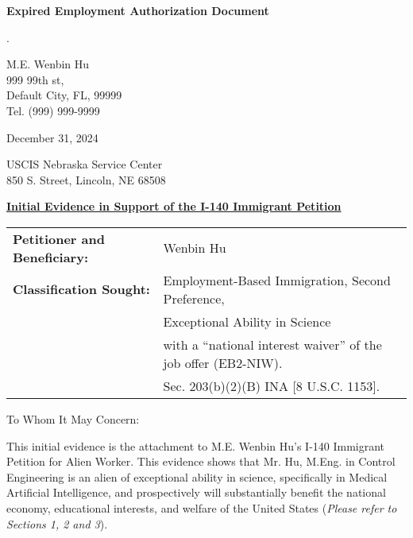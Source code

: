 \documentclass{article}
\begin{document}
% 

\vspace*{\fill}
\begin{center}

{\LARGE \bf
Expired Employment Authorization Document
}

\end{center}
\vspace*{\fill}

.

% 



\begin{flushright}
M.E. Wenbin Hu\\
999 99th st,\\
Default City, FL, 99999\\
Tel. (999) 999-9999
\end{flushright}

December 31, 2024

\label{IE}

USCIS Nebraska Service Center\\
850 S. Street, Lincoln, NE 68508

\underline{\bf Initial Evidence in Support of the I-140 Immigrant Petition}

\begin{tabular}{ll}
{\bf Petitioner and Beneficiary:} & Wenbin Hu \\
{\bf Classification Sought:} & Employment-Based Immigration, Second Preference, \\
& Exceptional Ability in Science \\
& with a “national interest waiver” of the job offer (EB2-NIW).\\
& Sec. 203(b)(2)(B) INA [8 U.S.C. 1153].
\end{tabular}
\vspace{2\baselineskip}

To Whom It May Concern:

This initial evidence is the attachment to M.E. Wenbin Hu’s I-140 Immigrant Petition for Alien Worker. This evidence shows that Mr. Hu, M.Eng. in Control Engineering is an alien of exceptional ability in science, specifically in Medical Artificial Intelligence, and prospectively will substantially benefit the national economy, educational interests, and welfare of the United States ({\it Please refer to Sections 1, 2 and 3}).
\end{document}
